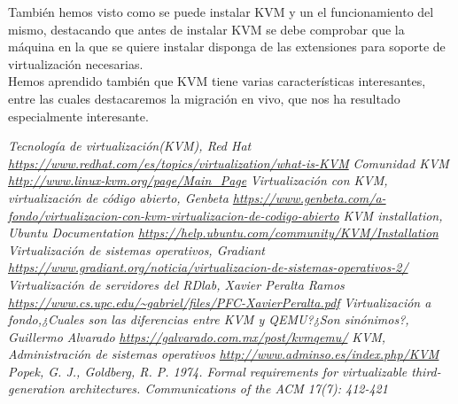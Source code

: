 \documentclass[11pt]{article}
\begin{document}
También hemos visto como se puede instalar KVM y un el funcionamiento del mismo, destacando que antes de instalar KVM se debe comprobar que la máquina en la que se quiere instalar disponga de las extensiones para soporte de virtualización necesarias. \\

Hemos aprendido también que KVM tiene varias características interesantes, entre las cuales destacaremos la migración en vivo, que nos ha resultado especialmente interesante. 


\newpage
\begin{thebibliography}{x}
	 \textit{Tecnología de virtualización(KVM), Red Hat \url{https://www.redhat.com/es/topics/virtualization/what-is-KVM}}
	 \textit{Comunidad KVM \url{http://www.linux-kvm.org/page/Main_Page}}
	 \textit{Virtualización con KVM, virtualización de código abierto, Genbeta \url{https://www.genbeta.com/a-fondo/virtualizacion-con-kvm-virtualizacion-de-codigo-abierto}}
	 \textit{KVM installation, Ubuntu Documentation \url{https://help.ubuntu.com/community/KVM/Installation}}
	 \textit{Virtualización de sistemas operativos, Gradiant \url{https://www.gradiant.org/noticia/virtualizacion-de-sistemas-operativos-2/}}
	 \textit{Virtualización de servidores del RDlab, Xavier Peralta Ramos \url{https://www.cs.upc.edu/~gabriel/files/PFC-XavierPeralta.pdf}}
	 \textit{Virtualización a fondo,¿Cuales son las diferencias entre KVM y QEMU?¿Son sinónimos?, Guillermo Alvarado \url{https://galvarado.com.mx/post/kvmqemu/}}
	 \textit{KVM, Administración de sistemas operativos \url{http://www.adminso.es/index.php/KVM}}
	 \textit{Popek, G. J., Goldberg, R. P. 1974. Formal requirements for virtualizable third-generation architectures. Communications of the ACM 17(7): 412-421}
\end{thebibliography}
\end{document}
